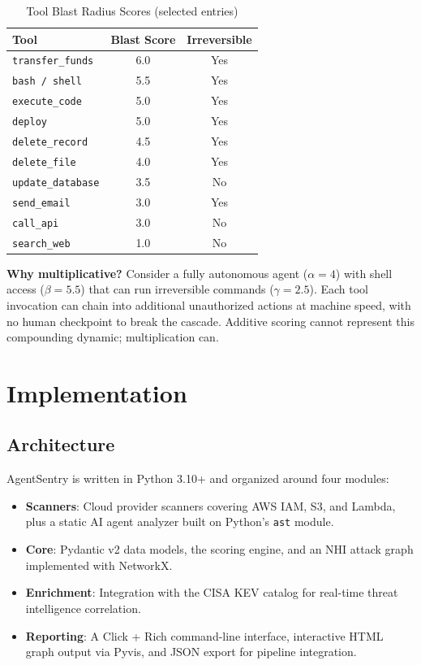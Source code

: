 \documentclass[conference]{IEEEtran}
\begin{document}
\begin{table}[h]
\caption{Tool Blast Radius Scores (selected entries)}
\label{tab:tool_blast}
\centering
\begin{tabular}{lcc}
\toprule
\textbf{Tool} & \textbf{Blast Score} & \textbf{Irreversible} \\
\midrule
\texttt{transfer\_funds} & 6.0 & Yes \\
\texttt{bash / shell} & 5.5 & Yes \\
\texttt{execute\_code} & 5.0 & Yes \\
\texttt{deploy} & 5.0 & Yes \\
\texttt{delete\_record} & 4.5 & Yes \\
\texttt{delete\_file} & 4.0 & Yes \\
\texttt{update\_database} & 3.5 & No \\
\texttt{send\_email} & 3.0 & Yes \\
\texttt{call\_api} & 3.0 & No \\
\texttt{search\_web} & 1.0 & No \\
\bottomrule
\end{tabular}
\end{table}

\textbf{Why multiplicative?} Consider a fully autonomous agent ($\alpha = 4$)
with shell access ($\beta = 5.5$) that can run irreversible commands ($\gamma =
2.5$). Each tool invocation can chain into additional unauthorized actions at
machine speed, with no human checkpoint to break the cascade. Additive scoring
cannot represent this compounding dynamic; multiplication can.

\section{Implementation}

\subsection{Architecture}

AgentSentry is written in Python 3.10+ and organized around four modules:

\begin{itemize}
  \item \textbf{Scanners}: Cloud provider scanners covering AWS IAM, S3, and
        Lambda, plus a static AI agent analyzer built on Python's \texttt{ast}
        module.
  \item \textbf{Core}: Pydantic v2 data models, the scoring engine, and an NHI
        attack graph implemented with NetworkX.
  \item \textbf{Enrichment}: Integration with the CISA KEV catalog for
        real-time threat intelligence correlation.
  \item \textbf{Reporting}: A Click + Rich command-line interface, interactive
        HTML graph output via Pyvis, and JSON export for pipeline integration.
\end{itemize}
\end{document}
